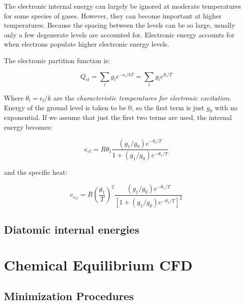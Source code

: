 \documentclass[10pt]{article}
\begin{document}
\begin{flushleft}
\begin{definition}
    The electronic internal energy can largely be ignored at moderate temperatures for some species of gases. However, they can become important at higher temperatures. Because the spacing between the levels can be so large, usually only a few degenerate levels are accounted for. Electronic energy accounts for when electrons populate higher electronic energy levels.
\end{definition}

\begin{definition}

    The electronic partition function is:

    \begin{equation}
        Q_{el} = \sum_l g_l e^{-\epsilon_l / kT} = \sum_l g_l e^{\theta_l / T}
    \end{equation}

    Where $\theta_l = \epsilon_l / k$ are the \textit{characteristic temperatures for electronic excitation}. Energy of the ground level is taken to be 0, so the first term is just $g_0$ with no exponential. If we assume that just the first two terms are used, the internal energy becomes:
    
    \begin{equation}
        e_{el} = R \theta_1 \frac{(g_1 / g_0)e^{-\theta_l / T}}{1 + (g_1/g_0)e^{-\theta_1 / T}}
    \end{equation}

    and the specific heat:

    \begin{equation}
        c_{v_{el}} = R \left( \frac{\theta_1}{T} \right)^2 \frac{(g_1/g_0) e^{-\theta_1 / T}}{[1 + (g_1/g_0) e^{-\theta_1 / T}]^2}
    \end{equation}
    
\end{definition}

\subsection{Diatomic internal energies}


\newpage
\section{Chemical Equilibrium CFD}

\subsection{Minimization Procedures}


\end{flushleft}
\end{document}
